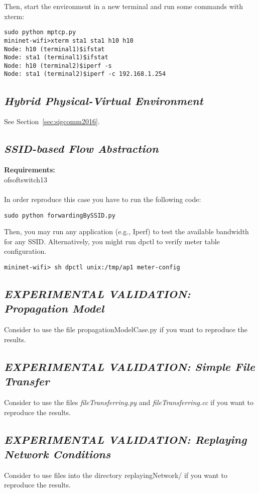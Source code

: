 \noindent Then, start the environment in a new terminal and run some commands with xterm:
\begin{verbatim}
sudo python mptcp.py   
mininet-wifi>xterm sta1 sta1 h10 h10  
Node: h10 (terminal1)$ifstat
Node: sta1 (terminal1)$ifstat
Node: h10 (terminal2)$iperf -s
Node: sta1 (terminal2)$iperf -c 192.168.1.254 
\end{verbatim}

\subsection{\textit{Hybrid Physical-Virtual Environment}}
See Section~\ref{sec:sigcomm2016}.

\subsection{\textit{SSID-based Flow Abstraction}}
\textbf{Requirements:\\}
ofsoftswitch13
\\
\\
In order reproduce this case you have to run the following code:
\begin{verbatim}
sudo python forwardingBySSID.py
\end{verbatim}

\noindent Then, you may run any application (e.g., Iperf) to test the available bandwidth for any SSID. Alternatively, you might run dpctl to verify meter table configuration.
\begin{verbatim}
mininet-wifi> sh dpctl unix:/tmp/ap1 meter-config
\end{verbatim}

\subsection{\textit{EXPERIMENTAL VALIDATION: Propagation Model}}
Consider to use the file propagationModelCase.py if you want to reproduce the results. 

\subsection{\textit{EXPERIMENTAL VALIDATION: Simple File Transfer}}
Consider to use the files \textit{fileTransferring.py} and \textit{fileTransferring.cc} if you want to reproduce the results. 

\subsection{\textit{EXPERIMENTAL VALIDATION: Replaying Network Conditions}}
Consider to use files into the directory replayingNetwork/ if you want to reproduce the results.